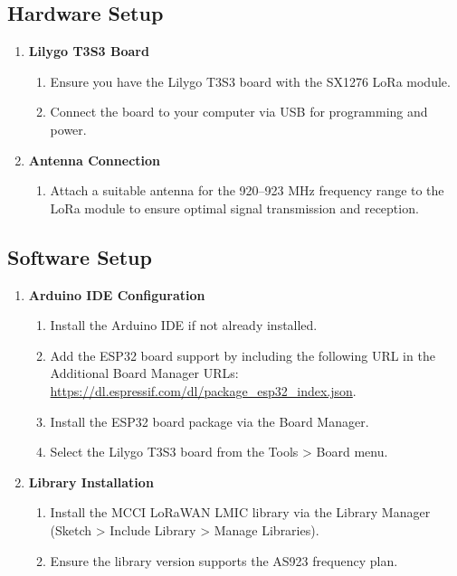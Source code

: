 \subsection{Hardware Setup}
\begin{enumerate}
    \item \textbf{Lilygo T3S3 Board}
          \begin{enumerate}
              \item Ensure you have the Lilygo T3S3 board with the SX1276 LoRa module.
              \item Connect the board to your computer via USB for programming and power.
          \end{enumerate}
    \item \textbf{Antenna Connection}
          \begin{enumerate}
              \item Attach a suitable antenna for the 920–923 MHz frequency range to the LoRa module to ensure optimal signal transmission and reception.
          \end{enumerate}
\end{enumerate}
\subsection{Software Setup}
\begin{enumerate}
    \item \textbf{Arduino IDE Configuration}
          \begin{enumerate}
              \item Install the Arduino IDE if not already installed.
              \item Add the ESP32 board support by including the following URL in the Additional Board Manager URLs: \url{https://dl.espressif.com/dl/package_esp32_index.json}.
              \item Install the ESP32 board package via the Board Manager.
              \item Select the Lilygo T3S3 board from the Tools > Board menu.
          \end{enumerate}
    \item \textbf{Library Installation}
          \begin{enumerate}
              \item Install the MCCI LoRaWAN LMIC library via the Library Manager (Sketch > Include Library > Manage Libraries).
              \item Ensure the library version supports the AS923 frequency plan.
          \end{enumerate}
\end{enumerate}
